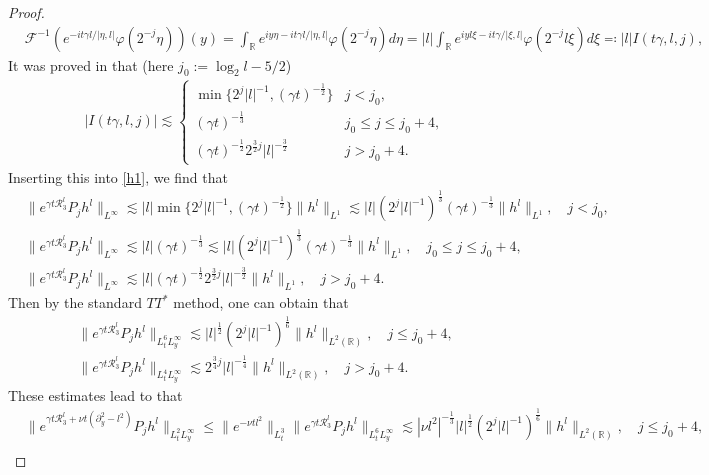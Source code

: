 \documentclass[11pt,reqno]{article}
\numberwithin{equation}{section}
\newcommand\R{{\mathbb R}}
\let\f=\frac
\begin{document}
\begin{appendices}
\begin{proof}
\begin{align*}
        &\mathcal{F}^{-1}(e^{-it\gamma l/|\eta,l|}\varphi(2^{-j}\eta))(y)=\int_{\R}e^{iy\eta-it\gamma l/|\eta,l|}\varphi(2^{-j}\eta)d\eta
        =|l|\int_{\R}e^{iyl\xi-it\gamma /|\xi,l|}\varphi(2^{-j}l\xi)d\xi\eqqcolon|l|I(t\gamma,l,j),
    \end{align*}
    It was proved in \cite{Coti-Zotto-Widmayer} that (here $j_0:=\log_2l-5/2$)
   \begin{align*}
        &|I(t\gamma,l,j)|\lesssim\left\{\begin{array}{ll}
                                          \min\{2^j|l|^{-1},(\gamma t)^{-\f12}\}&j<j_0, \\
                                          (\gamma t)^{-\f13}&j_0\leq j\leq j_0+4, \\
                                          (\gamma t)^{-\f12}2^{\f32j}|l|^{-\f32}&j>j_0+4.
                                        \end{array}
        \right.
    \end{align*} 
    Inserting this into \eqref{h1}, we find that
    \begin{align*}
        &\|e^{\gamma t \mathcal{R}_3^l}P_jh^l\|_{L^{\infty}}\lesssim |l|\min\{2^j|l|^{-1},(\gamma t)^{-\f12}\}\|h^l\|_{L^{1}}\lesssim |l|(2^j|l|^{-1})^{\f13}(\gamma t)^{-\f13}\|h^l\|_{L^{1}},\quad j<j_0,\\
        &\|e^{\gamma t \mathcal{R}_3^l}P_jh^l\|_{L^{\infty}} \lesssim |l|(\gamma t)^{-\f13} \lesssim |l|(2^j|l|^{-1})^{\f13}(\gamma t)^{-\f13}\|h^l\|_{L^{1}},\quad j_0\leq j\leq j_0+4,\\
        &\|e^{\gamma t \mathcal{R}_3^l}P_jh^l\|_{L^{\infty}} \lesssim |l|(\gamma t)^{-\f12}2^{\f32j}|l|^{-\f32}\|h^l\|_{L^{1}},\quad j >j_0+4.
    \end{align*}
   Then by the standard $TT^\ast$ method, one can obtain that
   \begin{align*}
        &\|e^{\gamma t \mathcal{R}_3^l}P_jh^l\|_{L_t^6L_y^{\infty}} 
        \lesssim |l|^{\f12}(2^j|l|^{-1})^{\f16}\|h^l\|_{L^{2}(\R)},\quad j\leq j_0+4,\\
        &\|e^{\gamma t \mathcal{R}_3^l}P_jh^l\|_{L_t^4L_y^{\infty}}
        \lesssim
        2^{\f34j}|l|^{-\f14}\|h^l\|_{L^{2}(\R)},\quad j >j_0+4.
    \end{align*}
    These estimates lead to that\begin{align*}
        &\|e^{\gamma t \mathcal{R}_3^l+\nu t(\partial_y^2-l^2)}P_jh^l\|_{L_t^2L_y^{\infty}}\leq \|e^{-\nu tl^2}\|_{L_t^3}\|e^{\gamma t \mathcal{R}_3^l}P_jh^l\|_{L_t^6L_y^{\infty}}\lesssim |\nu l^2|^{-\f13}|l|^{\f12}(2^j|l|^{-1})^{\f16}\|h^l\|_{L^{2}(\R)},\quad j\leq j_0+4,\\

\end{align*}
\end{proof}
\end{appendices}
\end{document}

